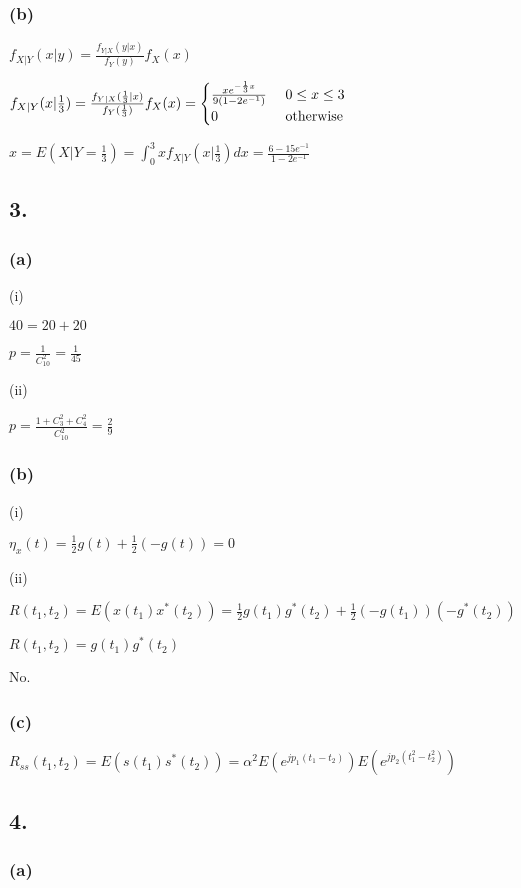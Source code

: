 \documentclass{article}
\begin{document}
\subsubsection*{(b)}
$f_{X|Y}(x|y)=\frac{f_{Y|X}(y|x)}{f_{Y}(y)}f_{X}(x)$\par
$f_{X|Y}(x|\frac{1}{3})=\frac{f_{Y|X}(\frac{1}{3}|x)}{f_{Y}(\frac{1}{3})}f_{X}(x)=\begin{cases}
\frac{xe^{-\frac{1}{3}x}}{9(1-2e^{-1})} \ & 0 \leq x \leq 3\\
0 \ & {\rm otherwise}
\end{cases}$\par\indent
\par
$\hat{x}=E(X|Y=\frac{1}{3})=\int_{0}^{3}xf_{X|Y}(x|\frac{1}{3})dx=\frac{6-15e^{-1}}{1-2e^{-1}}$
\subsection*{3.}
\subsubsection*{(a)}
(i)\par
$40=20+20$\par
$p=\frac{1}{C_{10}^{2}}=\frac{1}{45}$\par
(ii)\par
$p=\frac{1+C_{3}^{2}+C_{4}^{2}}{C_{10}^{2}}=\frac{2}{9}$
\subsubsection*{(b)}
(i)\par
$\eta_{x}(t)=\frac{1}{2}g(t)+\frac{1}{2}(-g(t))=0$\par
(ii)\par
$R(t_{1},t_{2})=E(x(t_{1})x^{*}(t_{2}))=\frac{1}{2}g(t_{1})g^{*}(t_{2})+\frac{1}{2}(-g(t_{1}))(-g^{*}(t_{2}))$\par
$R(t_{1},t_{2})=g(t_{1})g^{*}(t_{2})$\par
No.
\subsubsection*{(c)}
$R_{ss}(t_{1},t_{2})=E(s(t_{1})s^{*}(t_{2}))=\alpha^{2}E(e^{jp_{1}(t_{1}-t_{2})})E(e^{jp_{2}(t_{1}^{2}-t_{2}^{2})})$
\subsection*{4.}
\subsubsection*{(a)}
\end{document}
